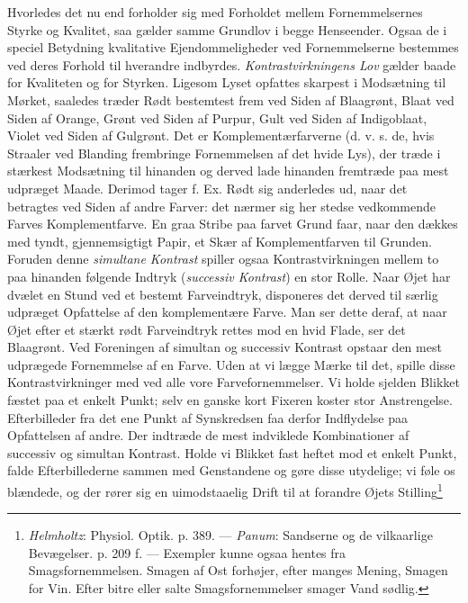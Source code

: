\documentclass[12pt,a4paper,openany]{book}
\newcommand{\opage}[1]{\marginnote{\footnotesize\textit{[#1]}}}
\begin{document}
Hvorledes det nu end forholder sig med Forholdet mellem Fornemmelsernes
Styrke og Kvalitet, saa gælder samme Grundlov i begge Henseender. Ogsaa
de i speciel Betydning kvalitative Ejendommeligheder ved Fornemmelserne
bestemmes ved deres Forhold til hverandre indbyrdes.
\emph{Kontrastvirkningens Lov} gælder baade for Kvaliteten og for
Styrken. Ligesom Lyset opfattes skarpest i Modsætning til Mørket,
saaledes træder Rødt bestemtest frem ved Siden af Blaagrønt, Blaat ved
Siden af Orange, Grønt ved Siden af Purpur, Gult ved Siden af
Indigoblaat, Violet ved Siden af Gulgrønt. Det er Komplementærfarverne
(d. v. s. de, hvis Straaler ved Blanding frembringe Fornemmelsen af det
hvide Lys), der træde i stærkest Modsætning til hinanden og derved lade
hinanden fremtræde paa mest udpræget Maade. Derimod tager f. Ex. Rødt
sig anderledes ud, naar det betragtes ved Siden af andre Farver: det
nærmer sig her stedse vedkommende Farves Komplementfarve. En graa Stribe
paa farvet Grund faar, naar den dækkes med tyndt, gjennemsigtigt Papir,
et Skær af Komplementfarven til Grunden. Foruden denne \emph{simultane
Kontrast} spiller ogsaa Kontrastvirkningen mellem to paa hinanden
følgende Indtryk (\emph{successiv Kontrast}) en stor Rolle. Naar Øjet
har dvælet en Stund ved et bestemt Farveindtryk, disponeres det derved
til særlig udpræget Opfattelse af den komplementære Farve. Man ser dette
deraf, at naar Øjet efter et stærkt rødt Farveindtryk rettes mod en hvid
Flade, ser det Blaagrønt. Ved Foreningen af simultan og successiv
Kontrast opstaar den mest udprægede Fornemmelse af en Farve. Uden at vi
lægge Mærke til det, spille disse Kontrastvirkninger med ved alle vore
Farvefornemmelser. Vi holde sjelden Blikket fæstet paa et enkelt Punkt;
selv en ganske kort Fixeren koster stor Anstrengelse. Efterbilleder fra
det ene Punkt af Synskredsen faa derfor Indflydelse paa Opfattelsen af
andre. Der indtræde de mest indviklede Kombinationer af successiv og
simultan Kontrast. Holde vi Blikket fast heftet mod et enkelt Punkt,
falde Efterbillederne sammen med Genstandene og gøre
\opage{139}disse utydelige; vi føle os blændede, og der rører sig en
uimodstaaelig Drift til at forandre Øjets
Stilling\footnote[1]{\emph{Helmholtz}: Physiol. Optik. p. 389. ---
\emph{Panum}: Sandserne og de vilkaarlige Bevægelser. p. 209 f. ---
Exempler kunne ogsaa hentes fra Smagsfornemmelsen. Smagen af Ost
forhøjer, efter manges Mening, Smagen for Vin. Efter bitre eller salte
Smagsfornemmelser smager Vand sødlig.}
\end{document}
